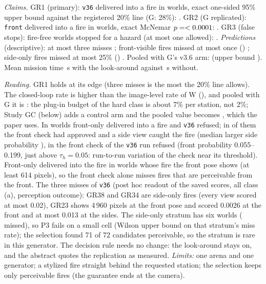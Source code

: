 \documentclass[conference]{IEEEtran}
\begin{document}
\emph{Claims.} GR1 (primary): \texttt{v36} delivered into a fire in \GRVThreeSix{} worlds, exact one-sided 95\% upper bound \GRVThreeSixUpper{} against the registered 20\% line (G: 28\%): \GROneHolds. GR2 (G replicated): \texttt{front} delivered into a fire in \GRFront{} worlds, exact McNemar $p=<0.0001$: \GRTwoHolds. GR3 (false stops): \GRFalseStops{} fire-free worlds stopped for a hazard (at most one allowed): \GRThreeHolds. \emph{Predictions} (descriptive): at most three misses \GRPredOne; front-visible fires missed at most once (\GRFrontVisible) \GRPredTwo; side-only fires missed at most 25\% (\GRSideOnly) \GRPredThree. Pooled with G's v3.6 arm: \GRPool{} (upper bound \GRPoolUpper). Mean mission time \GRTimeVThreeSix\,s with the look-around against \GRTimeFront\,s without.

\emph{Reading.} GR1 holds at its edge (three misses is the most the 20\% line allows). The closed-loop rate is higher than the image-level rate of W (\WMissLARate{}), and pooled with G it is \GRPool{}: the plug-in budget of the hard class is about 7\% per station, not 2\%; Study GC (below) adds a control arm and the pooled value becomes \GCPool{}, which the paper uses. In \GRDiscordant{} worlds front-only delivered into a fire and \texttt{v36} refused; in \GRCaughtSide{} of them the front check had approved and a side view caught the fire (median larger side probability \GRSideMedianP), in \GRCaughtFront{} the front check of the \texttt{v36} run refused (front probability 0.055--0.199, just above $\tau_h=0.05$: run-to-run variation of the check near its threshold). Front-only delivered into the fire in \GRFrontOnlyFrontVisible{} worlds whose fire the front pose shows (at least 614 pixels), so the front check alone misses fires that are perceivable from the front. The three misses of \texttt{v36} (post hoc readout of the saved scores, all class (a), perception outcome): GR38 and GR34 are side-only fires (every view scored at most 0.02), GR23 shows 4\,960 pixels at the front pose and scored 0.0026 at the front and at most 0.013 at the sides. The side-only stratum has six worlds (\GRSideOnly{} missed), so P3 fails on a small cell (Wilson upper bound \GRSideOnlyUpper{} on that stratum's miss rate); the selection found 71 of 72 candidates perceivable, so the stratum is rare in this generator. The decision rule needs no change: the look-around stays on, and the abstract quotes the replication as measured. \emph{Limits:} one arena and one generator; a stylized fire straight behind the requested station; the selection keeps only perceivable fires (the guarantee ends at the camera).
\end{document}
